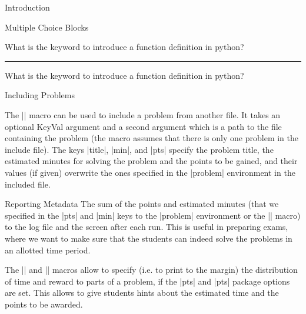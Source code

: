 \begin{sfragment}[id=sec:intro]{Introduction}
\begin{sfragment}[id=sec:user:mcq]{Multiple Choice Blocks}
\begin{sproblem}[title=Functions,name=functions2]
  What is the keyword to introduce a function definition in python?
  \begin{mcb}
  \end{mcb}
\end{sproblem}
\solutionstrue\hrule
\begin{sproblem}[title=Functions,name=functions3]
  What is the keyword to introduce a function definition in python?
  \begin{mcb}
  \end{mcb}
\end{sproblem}
\end{sfragment}

\begin{sfragment}[id=sec:user:includeproblem]{Including Problems}
  
\begin{function}{}
  The || macro can be used to include a problem from another file. It takes
  an optional KeyVal argument and a second argument which is a path to the file containing
  the problem (the macro assumes that there is only one problem in the include file). The
  keys |title|, |min|, and |pts| specify the problem title, the estimated minutes for
  solving the problem and the points to be gained, and their values (if given) overwrite
  the ones specified in the |problem| environment in the included file.
\end{function}
\end{sfragment}

\begin{sfragment}[id=sec:user:reporting]{Reporting Metadata}
The sum of the points and estimated minutes (that we specified in the |pts| and |min|
keys to the |problem| environment or the || macro) to the log file and
the screen after each run. This is useful in preparing exams, where we want to make sure
that the students can indeed solve the problems in an allotted time period.

The |\min| and |\pts| macros allow to specify (i.e. to print to the margin) the
distribution of time and reward to parts of a problem, if the |pts| and |pts| package
options are set. This allows to give students hints about the estimated time and the
points to be awarded.
\end{sfragment}


\end{sfragment}
